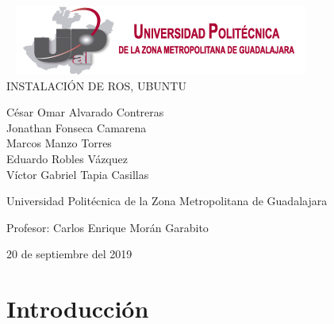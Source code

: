 \documentclass[11pt,a4paper,oldfontcommands,oneside]{memoir}
\begin{document}
%
%
\thispagestyle{empty}

{%
\sffamily
\centering
\Large

~\vspace{\fill}
\includegraphics[scale=1]{logo.png} \\
{\huge 
\vspace{4cm}
INSTALACIÓN DE ROS, UBUNTU
}
\vspace{2.5cm}

{\LARGE
César Omar Alvarado Contreras \\
Jonathan Fonseca Camarena \\
Marcos Manzo Torres \\
Eduardo Robles Vázquez \\
Víctor Gabriel Tapia Casillas

}

\vspace{2.5cm}

Universidad Politécnica de la Zona Metropolitana de Guadalajara

\vspace{3.5cm}

Profesor: Carlos Enrique Morán Garabito

\vspace{\fill}

20 de septiembre del 2019

}%

\vspace{.5cm}
\hfill\break




\tableofcontents*

\clearpage


\chapter{Introducción}
\end{document}
